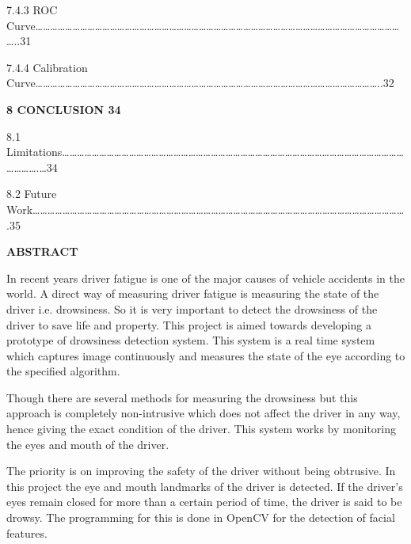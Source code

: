 \documentclass[a4paper,12pt]{article}
\begin{document}
7.4.3 ROC
Curve\ldots\ldots\ldots\ldots\ldots\ldots\ldots\ldots\ldots\ldots\ldots\ldots\ldots\ldots\ldots\ldots\ldots\ldots\ldots\ldots\ldots\ldots\ldots\ldots\ldots\ldots\ldots\ldots\ldots\ldots\ldots\ldots\ldots\ldots\ldots\ldots\ldots\ldots\ldots\ldots\ldots\ldots\ldots\ldots\ldots\ldots\ldots\ldots\ldots\ldots..31

7.4.4 Calibration
Curve\ldots\ldots\ldots\ldots\ldots\ldots\ldots\ldots\ldots\ldots\ldots\ldots\ldots\ldots\ldots\ldots\ldots\ldots\ldots\ldots\ldots\ldots\ldots\ldots\ldots\ldots\ldots\ldots\ldots\ldots\ldots\ldots\ldots\ldots\ldots\ldots\ldots\ldots\ldots\ldots\ldots\ldots\ldots\ldots\ldots\ldots..32

\textbf{8 CONCLUSION 34}

8.1
Limitations\ldots\ldots\ldots\ldots\ldots\ldots\ldots\ldots\ldots\ldots\ldots\ldots\ldots\ldots\ldots\ldots\ldots\ldots\ldots\ldots\ldots\ldots\ldots\ldots\ldots\ldots\ldots\ldots\ldots\ldots\ldots\ldots\ldots\ldots\ldots\ldots\ldots\ldots\ldots\ldots\ldots\ldots\ldots\ldots\ldots\ldots\ldots\ldots\ldots\ldots.\ldots34

8.2 Future
Work\ldots\ldots\ldots\ldots\ldots\ldots\ldots\ldots\ldots\ldots\ldots\ldots\ldots\ldots\ldots\ldots\ldots\ldots\ldots\ldots\ldots\ldots\ldots\ldots\ldots\ldots\ldots\ldots\ldots\ldots\ldots\ldots\ldots\ldots\ldots\ldots\ldots\ldots\ldots\ldots\ldots\ldots\ldots\ldots\ldots\ldots\ldots\ldots\ldots\ldots.35

\textbf{ABSTRACT}

In recent years driver fatigue is one of the major causes of vehicle
accidents in the world. A direct way of measuring driver fatigue is
measuring the state of the driver i.e. drowsiness. So it is very
important to detect the drowsiness of the driver to save life and
property. This project is aimed towards developing a prototype of
drowsiness detection system. This system is a real time system which
captures image continuously and measures the state of the eye according
to the specified algorithm.

Though there are several methods for measuring the drowsiness but this
approach is completely non-intrusive which does not affect the driver in
any way, hence giving the exact condition of the driver. This system
works by monitoring the eyes and mouth of the driver.

The priority is on improving the safety of the driver without being
obtrusive. In this project the eye and mouth landmarks of the driver is
detected. If the driver's eyes remain closed for more than a certain
period of time, the driver is said to be drowsy. The programming for
this is done in OpenCV for the detection of facial features.
\end{document}
